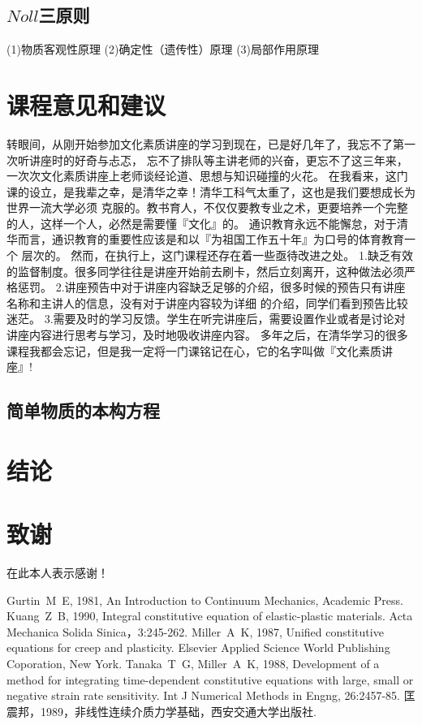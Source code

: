 \documentclass[a4paper]{cctart}
\numberwithin{equation}{section} \pagestyle{fancy}
\begin{document}
\subsection{$Noll$三原则}

(1){\kaishu 物质客观性原理}
(2){\kaishu 确定性（遗传性）原理}
(3){\kaishu 局部作用原理}


\section{课程意见和建议}\label{3}
转眼间，从刚开始参加文化素质讲座的学习到现在，已是好几年了，我忘不了第一次听讲座时的好奇与忐忑，
忘不了排队等主讲老师的兴奋，更忘不了这三年来，一次次文化素质讲座上老师谈经论道、思想与知识碰撞的火花。
在我看来，这门课的设立，是我辈之幸，是清华之幸！清华工科气太重了，这也是我们要想成长为世界一流大学必须
克服的。教书育人，不仅仅要教专业之术，更要培养一个完整的人，这样一个人，必然是需要懂『文化』的。
通识教育永远不能懈怠，对于清华而言，通识教育的重要性应该是和以『为祖国工作五十年』为口号的体育教育一个
层次的。
然而，在执行上，这门课程还存在着一些亟待改进之处。
1.缺乏有效的监督制度。很多同学往往是讲座开始前去刷卡，然后立刻离开，这种做法必须严格惩罚。
2.讲座预告中对于讲座内容缺乏足够的介绍，很多时候的预告只有讲座名称和主讲人的信息，没有对于讲座内容较为详细
的介绍，同学们看到预告比较迷茫。
3.需要及时的学习反馈。学生在听完讲座后，需要设置作业或者是讨论对讲座内容进行思考与学习，及时地吸收讲座内容。
多年之后，在清华学习的很多课程我都会忘记，但是我一定将一门课铭记在心，它的名字叫做『文化素质讲座』!


\subsection{简单物质的本构方程}


\section{结论}

\section{致谢}
在此本人表示感谢！

\begin{thebibliography}{9}
Gurtin~M~E, 1981, An Introduction to Continuum
Mechanics, Academic Press.
Kuang~Z~B, 1990, Integral constitutive equation
of elastic-plastic materials. Acta Mechanica Solida
Sinica，3:245-262.
Miller~A~K, 1987, Unified constitutive equations
for creep and plasticity. Elsevier Applied Science World
Publishing Coporation, New York.
Tanaka~T~G, Miller~A~K, 1988, Development of a
method for integrating time-dependent constitutive equations with
large, small or negative strain rate sensitivity. Int J Numerical
Methods in Engng, 26:2457-85.
 匡震邦，1989，非线性连续介质力学基础，西安交通大学出版社.
\end{thebibliography}
\end{document}
